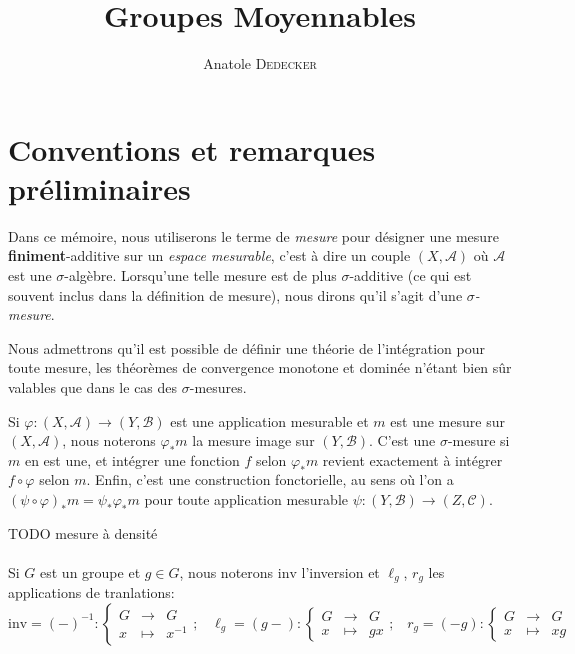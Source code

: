 \documentclass[a4paper,12pt]{article}
\newcommand\fundef[3]{#1: \left\{\begin{array}{ccc}#2\\#3\end{array}\right.}
\newcommand{\inv}{^{-1}}
\newcommand{\comp}{\circ}
\newcommand{\blank}{{-}}
\newcommand{\invop}{\mathrm{inv}}
\begin{document}
\begin{titlepage}
\title{Groupes Moyennables}
\author{Anatole \textsc{Dedecker}}
\maketitle
\thispagestyle{empty}
\end{titlepage}

\tableofcontents
\thispagestyle{empty}

\clearpage


\section*{Conventions et remarques préliminaires}

Dans ce mémoire, nous utiliserons le terme de \textit{mesure} pour désigner une mesure \textbf{finiment}-additive sur un 
\textit{espace mesurable}, c'est à dire un couple $(X, \mathcal{A})$ où $\mathcal{A}$ est une $\sigma$-algèbre. 
Lorsqu'une telle mesure est de plus $\sigma$-additive (ce qui est souvent inclus dans la définition de \og{}mesure\fg{}),
nous dirons qu'il s'agit d'une \textit{$\sigma$-mesure}. 

Nous admettrons qu'il est possible de définir une théorie de l'intégration pour toute mesure, les théorèmes de convergence
monotone et dominée n'étant bien sûr valables que dans le cas des $\sigma$-mesures. 

Si $\varphi:(X,\mathcal{A})\to(Y,\mathcal{B})$ est une application mesurable et $m$ est une mesure sur $(X, \mathcal{A})$, 
nous noterons $\varphi_*m$ la mesure image sur $(Y, \mathcal{B})$. C'est une $\sigma$-mesure si $m$ en est une, et intégrer 
une fonction $f$ selon $\varphi_*m$ revient exactement à intégrer $f\comp\varphi$ selon $m$. Enfin, c'est une construction
fonctorielle, au sens où l'on a $(\psi\comp\varphi)_*m = \psi_*\varphi_*m$ pour toute application mesurable 
$\psi : (Y, \mathcal{B})\to(Z, \mathcal{C})$. 

TODO mesure à densité

\paragraph{}
Si $G$ est un groupe et $g\in G$, nous noterons $\invop$ l'inversion et $\ell_g$, $r_g$ les applications de tranlations:
\begin{equation*}
    \fundef{\invop = (\blank)\inv}{G&\to& G}{x&\mapsto& x\inv}\text{;}\quad\fundef{\ell_g=(g\blank)}{G&\to& G}{x&\mapsto& gx}\text{;}\quad\fundef{r_g=(\blank g)}{G&\to& G}{x&\mapsto& xg}
\end{equation*}
\end{document}
